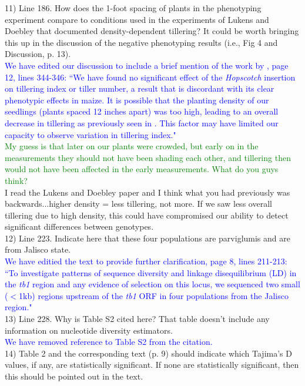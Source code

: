 \documentclass[11pt]{article}
\newcommand{\res}[1]{\noindent \textcolor{blue}{{#1}} \\}
\newcommand{\lev}[1]{\noindent \textcolor{green}{{#1}} \\}
\newcommand{\mbh}[1]{\noindent \textcolor{Dandelion}{{#1}}\\}
\begin{document}
11) Line 186. How does the 1-foot spacing of plants in the phenotyping experiment compare to conditions used in the experiments of Lukens and Doebley that documented density-dependent tillering? It could be worth bringing this up in the discussion of the negative phenotyping results (i.e., Fig 4 and Discussion, p. 13). \\

\res{We have edited our discussion to include a brief mention of the work by \citet{LukensDoebley1999}, page 12, lines 344-346: ``We have found no significant effect of the \emph{Hopscotch} insertion on tillering index or tiller number, a result that is discordant with its clear phenotypic effects in maize. It is possible that the planting density of our seedlings (plants spaced 12 inches apart) was too high, leading to an overall decrease in tillering as previously seen in \citet{LukensDoebley1999}.  This factor may have limited our capacity to observe variation in tillering index."}

\lev{My guess is that later on our plants were crowded, but early on in the measurements they should not have been shading each other, and tillering then would not have been affected in the early measurements. What do you guys think?}

\mbh{I read the Lukens and Doebley paper and I think what you had previously was backwards...higher density = less tillering, not more.  If we saw less overall tillering due to high density, this could have compromised our ability to detect significant differences between genotypes.}

12) Line 223. Indicate here that these four populations are parviglumis and are from Jalisco state. \\

\res{We have editied the text to provide further clarification, page 8, lines 211-213: ``To investigate patterns of sequence diversity and linkage disequilibrium (LD) in the \emph{tb1} region and any evidence of selection on this locus, we sequenced two small ($<$1kb) regions upstream of the \emph{tb1} ORF in four populations from the Jalisco region."}

13) Line 228. Why is Table S2 cited here? That table doesn't include any information on nucleotide diversity estimators.\\

\res{We have removed reference to Table S2 from the citation.}

14) Table 2 and the corresponding text (p. 9) should indicate which Tajima's D values, if any, are statistically significant. If none are statistically significant, then this should be pointed out in the text. \\
\end{document}
